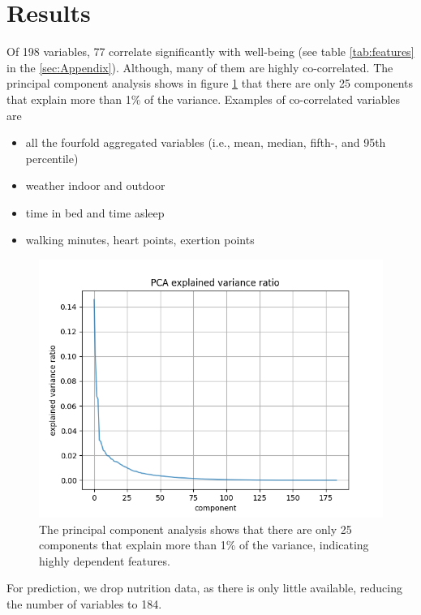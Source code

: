 \documentclass[conference]{IEEEtran}
\begin{document}
\section{Results}
Of 198 variables, 77 correlate significantly with well-being (see table \ref{tab:features} in the \ref{sec:Appendix}). Although, many of them are highly co-correlated. The principal component analysis shows in figure \ref{fig:pca} that there are only 25 components that explain more than 1\% of the variance. Examples of co-correlated variables are
\begin{itemize}
    \item all the fourfold aggregated variables (i.e., mean, median, fifth-, and 95th percentile)
    \item weather indoor and outdoor
    \item time in bed and time asleep
    \item walking minutes, heart points, exertion points
\end{itemize}

\begin{figure}[htbp]
\begin{center}
\includegraphics[width=1\linewidth]{pca_explained_variance_ratio.png}
\caption{The principal component analysis shows that there are only 25 components that explain more than 1\% of the variance, indicating highly dependent features.}
\label{fig:pca}
\end{center}
\end{figure}

For prediction, we drop nutrition data, as there is only little available, reducing the number of variables to 184.
\end{document}
